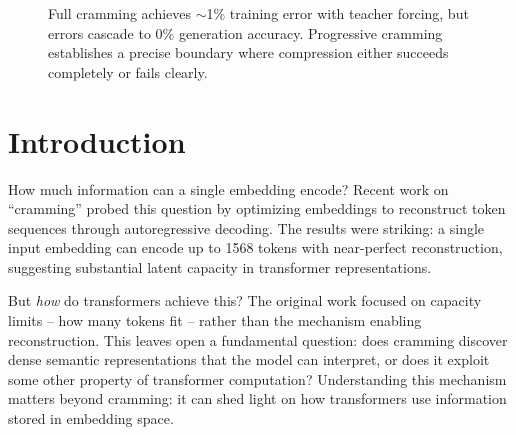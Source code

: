 \documentclass{article}
\theoremstyle{plain}
\theoremstyle{definition}
\theoremstyle{remark}
\begin{document}
\begin{abstract}
    Token cramming compresses sequences into learned embeddings with near-perfect reconstruction, but fixed token budgets and 99\% accuracy thresholds leave it unclear whether residual errors reflect optimization failures or fundamental limits.
    We introduce progressive cramming, which grows the target prefix token-by-token, stopping only when reconstruction is no longer achievable within a fixed optimization budget.
    Progressive trajectories occupy low-dimensional structure in embedding space.
    Prepending a crammed embedding causes a moderate but consistent accuracy drop on multiple-choice benchmarks even with the original prefix in context, and collapses capability almost entirely under generative evaluation.
    Causal attention-knockout interventions trace this degradation to the embedding's interactions in the model's early layers.
    These results position progressive cramming as a tool for studying compression limits and show that perfect reconstruction---achievable through brittle steering rather than transferable semantics---is insufficient for meaningful compression.
\end{abstract}


\begin{figure}[h]
    \centering
    
    \caption{Full cramming achieves ${\sim}$1\% training error with teacher forcing, but errors cascade to 0\% generation accuracy. Progressive cramming establishes a precise boundary where compression either succeeds completely or fails clearly.}
    \label{fig:visual_abstract}
\end{figure}



\section{Introduction}
\label{sec:introduction}

How much information can a single embedding encode?
Recent work on ``cramming'' \cite{kuratov2025cramming} probed this question by optimizing embeddings to reconstruct token sequences through autoregressive decoding.
The results were striking: a single input embedding can encode up to 1568 tokens with near-perfect reconstruction, suggesting substantial latent capacity in transformer representations.

But \emph{how} do transformers achieve this?
The original work focused on capacity limits -- how many tokens fit -- rather than the mechanism enabling reconstruction.
This leaves open a fundamental question: does cramming discover dense semantic representations that the model can interpret, or does it exploit some other property of transformer computation?
Understanding this mechanism matters beyond cramming: it can shed light on how transformers use information stored in embedding space.
\end{document}
